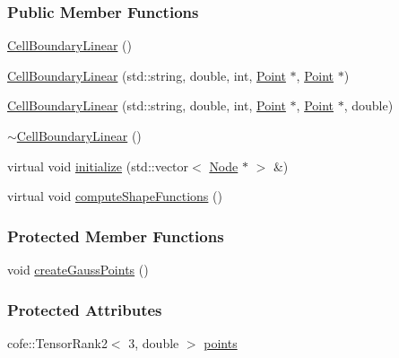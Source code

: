 \subsubsection*{Public Member Functions}
\begin{DoxyCompactItemize}
\item 
\hyperlink{classmknix_1_1_cell_boundary_linear_aa83f76ade7dd5353609685270f0cc91d}{Cell\+Boundary\+Linear} ()
\item 
\hyperlink{classmknix_1_1_cell_boundary_linear_abd081fad99e161a237a72223f6d70887}{Cell\+Boundary\+Linear} (std\+::string, double, int, \hyperlink{classmknix_1_1_point}{Point} $\ast$, \hyperlink{classmknix_1_1_point}{Point} $\ast$)
\item 
\hyperlink{classmknix_1_1_cell_boundary_linear_a3e2f2235aa3af604f1a81af20d4429f2}{Cell\+Boundary\+Linear} (std\+::string, double, int, \hyperlink{classmknix_1_1_point}{Point} $\ast$, \hyperlink{classmknix_1_1_point}{Point} $\ast$, double)
\item 
\hyperlink{classmknix_1_1_cell_boundary_linear_acf34a61929cd06bbc0cfedf4005254c9}{$\sim$\+Cell\+Boundary\+Linear} ()
\item 
virtual void \hyperlink{classmknix_1_1_cell_boundary_linear_ab0f0e66b92accf5c88aaa7fac0b8bf59}{initialize} (std\+::vector$<$ \hyperlink{classmknix_1_1_node}{Node} $\ast$ $>$ \&)
\item 
virtual void \hyperlink{classmknix_1_1_cell_boundary_linear_aea9ed39a191f3e6e89c465f6e3db3002}{compute\+Shape\+Functions} ()
\end{DoxyCompactItemize}
\subsubsection*{Protected Member Functions}
\begin{DoxyCompactItemize}
\item 
void \hyperlink{classmknix_1_1_cell_boundary_linear_a45b26c454824aac48876515f9bf154e9}{create\+Gauss\+Points} ()
\end{DoxyCompactItemize}
\subsubsection*{Protected Attributes}
\begin{DoxyCompactItemize}
\item 
cofe\+::\+Tensor\+Rank2$<$ 3, double $>$ \hyperlink{classmknix_1_1_cell_boundary_linear_aacc5e09eb0a0659471b7d464f506d276}{points}
\end{DoxyCompactItemize}


